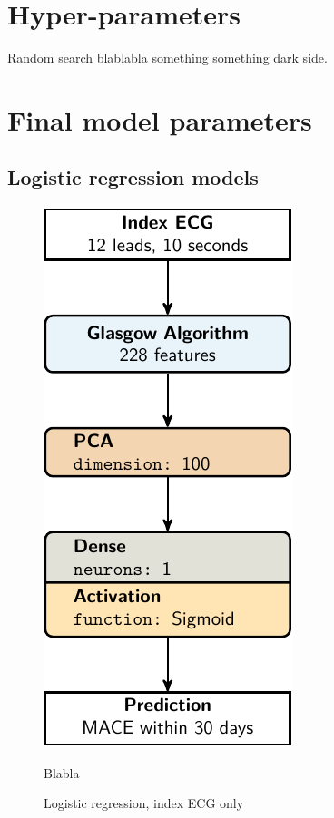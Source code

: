 \documentclass[preprint]{elsarticle}
\begin{document}
\section{Hyper-parameters}
Random search blablabla something something dark side.

\section{Final model parameters}
\subsection{Logistic regression models}
\begin{figure}[h!]
\centering
\includegraphics[]{figures/model-lr1.pdf}
\caption{Logistic regression, index ECG only}
\medskip
\small
Blabla
\end{figure}
\end{document}
